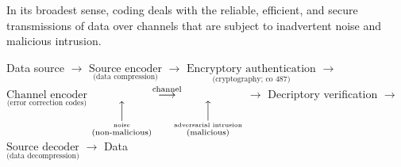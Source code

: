 
In its broadest sense, coding deals with the reliable, efficient, and secure
transmissions of data over channels that are subject to inadvertent noise and
malicious intrusion.

Data source
$ \rightarrow $
$ \underset{\text{(data compression)}}{\text{Source encoder}} $
$ \rightarrow $
$ \underset{\text{(cryptography; co 487)}}{\text{Encryptory authentication}} $
$ \rightarrow $
$ \underset{\text{(error correction codes)}}{\text{Channel encoder}} $
$ \underset
{
    \overset{\Big\uparrow}{\overset{\text{noise}}{\text{(non-malicious)}}}\qquad
    \overset{\Big\uparrow}{\overset{\text{adversarial intrusion}}{\text{(malicious)}}}
}
{\overset{\text{channel}}{\longrightarrow}} $
$ \rightarrow $
Decriptory verification
$ \rightarrow $
$ \underset{\text{(data decompression)}}{\text{Source decoder}}  $
$ \rightarrow $
Data